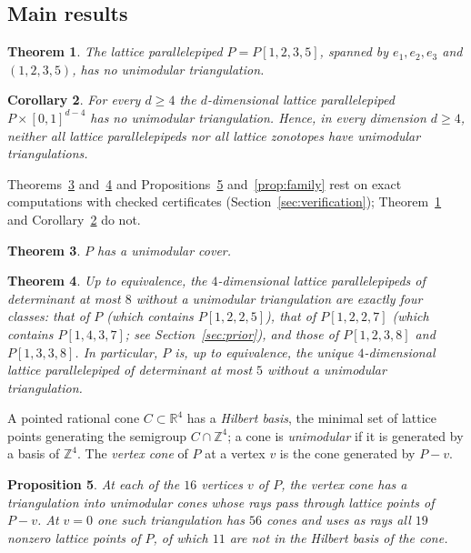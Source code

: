 \documentclass[11pt]{article}
\newtheorem{theorem}{Theorem}[section]
\newtheorem{proposition}[theorem]{Proposition}
\newtheorem{corollary}[theorem]{Corollary}
\theoremstyle{definition}
\newcommand{\Z}{\mathbb{Z}}
\newcommand{\R}{\mathbb{R}}
\begin{document}
\subsection{Main results}

\begin{theorem}\label{thm:main}
The lattice parallelepiped $P=P[1,2,3,5]$, spanned by $e_1,e_2,e_3$ and
$(1,2,3,5)$, has no unimodular triangulation.
\end{theorem}

\begin{corollary}\label{cor:all}
For every $d\ge4$ the $d$-dimensional lattice parallelepiped
$P\times[0,1]^{d-4}$ has no unimodular triangulation. Hence, in every
dimension $d\ge4$, neither all lattice parallelepipeds nor all lattice
zonotopes have unimodular triangulations.
\end{corollary}

Theorems~\ref{thm:cover}
and~\ref{thm:classes} and Propositions~\ref{prop:cones}
and~\ref{prop:family} rest on exact computations with checked certificates
(Section~\ref{sec:verification}); Theorem~\ref{thm:main} and
Corollary~\ref{cor:all} do not.

\begin{theorem}\label{thm:cover}
$P$ has a unimodular cover.
\end{theorem}

\begin{theorem}\label{thm:classes}
Up to equivalence, the $4$-dimensional lattice parallelepipeds of
determinant at most $8$ without a unimodular triangulation are exactly four
classes: that of $P$ (which contains $P[1,2,2,5]$), that of $P[1,2,2,7]$
(which contains $P[1,4,3,7]$; see Section~\ref{sec:prior}), and those of
$P[1,2,3,8]$ and $P[1,3,3,8]$. In particular, $P$ is, up to equivalence,
the unique $4$-dimensional lattice parallelepiped of determinant at most $5$
without a unimodular triangulation.
\end{theorem}

A pointed rational cone $C\subset\R^4$ has a \emph{Hilbert basis}, the
minimal set of lattice points generating the semigroup $C\cap\Z^4$; a cone
is \emph{unimodular} if it is generated by a basis of $\Z^4$. The
\emph{vertex cone} of $P$ at a vertex $v$ is the cone generated by $P-v$.

\begin{proposition}\label{prop:cones}
At each of the $16$ vertices $v$ of $P$, the vertex cone has a
triangulation into unimodular cones whose rays pass through lattice points
of $P-v$. At $v=0$ one such triangulation has $56$ cones and uses as rays all
$19$ nonzero lattice points of $P$, of which $11$ are not in the Hilbert
basis of the cone.
\end{proposition}
\end{document}
